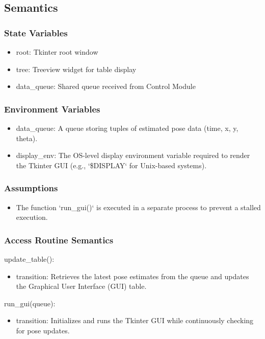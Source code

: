 \documentclass[12pt, titlepage]{article}
\begin{document}
\subsection{Semantics}

\subsubsection{State Variables}
\begin{itemize}
  \item root: Tkinter root window
  \item tree: Treeview widget for table display
  \item data\_queue: Shared queue received from Control Module
\end{itemize}
\subsubsection{Environment Variables}
\begin{itemize}
  \item data\_queue: A queue storing tuples of estimated pose data (time, x, y, theta).
  \item display\_env: The OS-level display environment variable required to render the Tkinter GUI (e.g., `\$DISPLAY` for Unix-based systems).
\end{itemize}

\subsubsection{Assumptions}
\begin{itemize}
  \item The function `run\_gui()` is executed in a separate process to prevent a stalled execution.
\end{itemize}
\subsubsection{Access Routine Semantics}

\noindent update\_table():
\begin{itemize}
    \item transition: Retrieves the latest pose estimates from the queue and updates the Graphical User Interface (GUI) table.
\end{itemize}

\noindent run\_gui(queue):
\begin{itemize}
    \item transition: Initializes and runs the Tkinter GUI while continuously checking for pose updates.
\end{itemize}
\end{document}
